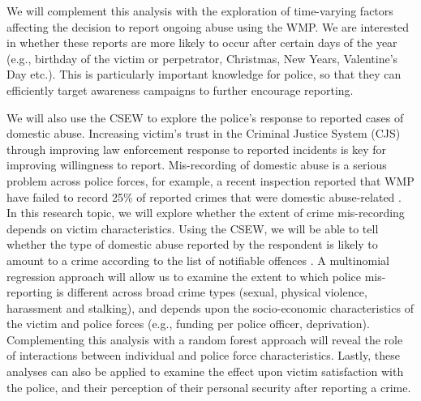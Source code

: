 \documentclass[11pt, a4paper]{article}
\begin{document}
We will complement this analysis with the exploration of time-varying factors affecting the decision to report ongoing abuse using the WMP. We are interested in whether these reports are more likely to occur after certain days of the year (e.g., birthday of the victim or perpetrator, Christmas, New Years, Valentine's Day etc.). This is particularly important knowledge for police, so that they can efficiently target awareness campaigns to further encourage reporting.
 
 
%
%
%
%


We will also use the CSEW to explore the police's response to reported cases of domestic abuse. Increasing victim's trust in the Criminal Justice System (CJS) through improving law enforcement response to reported incidents is key for improving willingness to report. Mis-recording of domestic abuse is a serious problem across police forces, for example, a recent inspection reported that WMP have failed to record 25\% of reported crimes that were domestic abuse-related \cite{HerMajestysInspectorateofConstabularyandFires&RescueServices2019}. In this research topic, we will explore whether the extent of crime mis-recording depends on victim characteristics. Using the CSEW, we will be able to tell whether the type of domestic abuse reported by the respondent is likely to amount to a crime according to the list of notifiable offences \cite{countingrules}. A multinomial regression approach will allow us to examine the extent to which police mis-reporting is different across broad crime types (sexual, physical violence, harassment and stalking), and depends upon the socio-economic characteristics of the victim and police forces (e.g., funding per police officer, deprivation). Complementing this analysis with a random forest approach will reveal the role of interactions between individual and police force characteristics. Lastly, these analyses can also be applied to examine the effect upon victim satisfaction with the police, and their perception of their personal security after reporting a crime.
\end{document}
